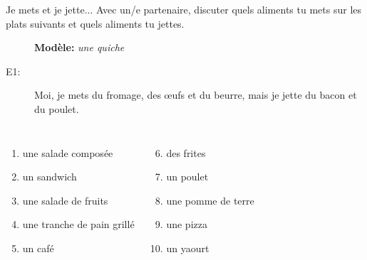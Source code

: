 \documentclass{beamer}
\begin{document}
  \begin{frame}{Je mets et je jette...}
    Avec un/e partenaire, discuter quels aliments tu \alert{mets} sur les plats suivants et quels aliments tu \alert{jettes}. \\
    \begin{description}
      \item[] \textbf{Modèle:} \emph{une quiche}
      \item[E1:] Moi, je mets du fromage, des œufs et du beurre, mais je jette du bacon et du poulet.
    \end{description}
    \begin{columns}
        \begin{enumerate}
          \item une salade composée
          \item un sandwich
          \item une salade de fruits
          \item une tranche de pain grillé
          \item un café
        \end{enumerate}
        \begin{enumerate}
          \setcounter{enumi}{5}
          \item des frites
          \item un poulet
          \item une pomme de terre
          \item une pizza
          \item un yaourt
        \end{enumerate}
    \end{columns}
  \end{frame}
\end{document}
